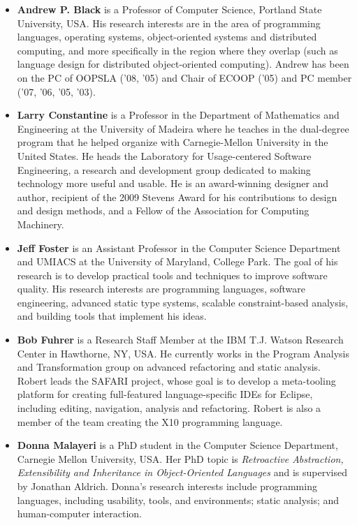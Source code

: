 \documentclass{sigplanconf}
\begin{document}
\begin{itemize}

\item \textbf{Andrew P. Black} is a Professor of Computer Science,
  Portland State University, USA. His research interests are in the
  area of programming languages, operating systems, object-oriented
  systems and distributed computing, and more specifically in the
  region where they overlap (such as language design for distributed
  object-oriented computing). Andrew has been on the PC of OOPSLA
  ('08, '05) and Chair of ECOOP ('05) and PC member ('07, '06, '05,
  '03).

\item \textbf{Larry Constantine} is a Professor in the Department of
  Mathematics and Engineering at the University of Madeira where he
  teaches in the dual-degree program that he helped organize with
  Carnegie-Mellon University in the United States. He heads the
  Laboratory for Usage-centered Software Engineering, a research and
  development group dedicated to making technology more useful and
  usable. He is an award-winning designer and author, recipient of the
  2009 Stevens Award for his contributions to design and design
  methods, and a Fellow of the Association for Computing Machinery.

\item \textbf{Jeff Foster} is an Assistant Professor in the Computer
  Science Department and UMIACS at the University of Maryland, College
  Park. The goal of his research is to develop practical tools and
  techniques to improve software quality. His research interests are
  programming languages, software engineering, advanced static type
  systems, scalable constraint-based analysis, and building tools that
  implement his ideas.

\item \textbf{Bob Fuhrer} is a Research Staff Member at the IBM
  T.J. Watson Research Center in Hawthorne, NY, USA. He currently
  works in the Program Analysis and Transformation group on advanced
  refactoring and static analysis. Robert leads the SAFARI project,
  whose goal is to develop a meta-tooling platform for creating
  full-featured language-specific IDEs for Eclipse, including editing,
  navigation, analysis and refactoring. Robert is also a member of the
  team creating the X10 programming language.

\item \textbf{Donna Malayeri} is a PhD student in the Computer Science
  Department, Carnegie Mellon University, USA. Her PhD topic is
  \emph{Retroactive Abstraction, Extensibility and Inheritance in
    Object-Oriented Languages} and is supervised by Jonathan
  Aldrich. Donna's research interests include programming languages,
  including usability, tools, and environments; static analysis; and
  human-computer interaction.


\end{itemize}
\end{document}

